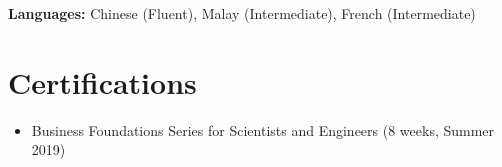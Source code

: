 \documentclass[letterpaper,11pt]{article}
\newcommand{\resumeItem}[2]{
  \item\small{
    \textbf{#1}{: #2 \vspace{-3pt}}
  }
}
\newcommand{\resumeItemAlt}[1]{
  \item\small {#1 \vspace{-3pt}
  }
}
\newcommand{\resumeSubItem}[2]{\resumeItem{#1}{#2}\vspace{-3.5pt}}
\newcommand{\CertificationsSubItem}[1]{\resumeItemAlt{#1}\vspace{-3.5pt}}
\newcommand{\resumeSubHeadingListStart}{\begin{itemize}[leftmargin=*]}
\newcommand{\resumeSubHeadingListEnd}{\end{itemize}}
\begin{document}
      

      \textbf{Languages:} Chinese (Fluent), Malay (Intermediate), French (Intermediate)




\section{\color{BlueViolet} Certifications}
  \resumeSubHeadingListStart
  
      \CertificationsSubItem {Business Foundations Series for Scientists and Engineers (8 weeks, Summer 2019)}
      
      \begin{comment}
      
      \resumeSubItem{Awards}
      {1st Place Team in Malaysian Math Olympiad (2009), Silver Prize in Australian Mathematics Competition (2009), 2nd Place in high school English Essay Writing Competition (2010), Semi-finalist in Malaysian National Classical Guitar Competition (2010).}
     
      
      \end{comment}
      
      \begin{comment}
      
      \resumeSubItem{Scholarships}
      {Stuff}
      
      \end{comment}
      
  \resumeSubHeadingListEnd


\end{document}
